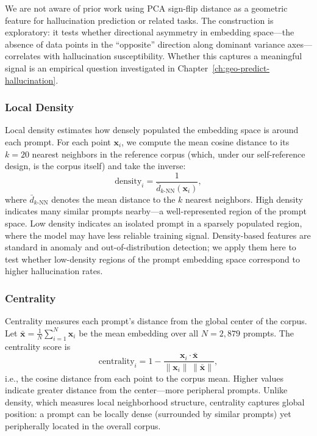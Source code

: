 We are not aware of prior work using PCA sign-flip distance as a geometric feature for hallucination prediction or related tasks. The construction is exploratory: it tests whether directional asymmetry in embedding space---the absence of data points in the ``opposite'' direction along dominant variance axes---correlates with hallucination susceptibility. Whether this captures a meaningful signal is an empirical question investigated in Chapter~\ref{ch:geo-predict-hallucination}.

\subsubsection{Local Density}
\label{sec:density}

Local density estimates how densely populated the embedding space is around each prompt. For each point $\mathbf{x}_i$, we compute the mean cosine distance to its $k = 20$ nearest neighbors in the reference corpus (which, under our self-reference design, is the corpus itself) and take the inverse:
\begin{equation}
\text{density}_i = \frac{1}{\bar{d}_{k\text{-NN}}(\mathbf{x}_i)},
\label{eq:density}
\end{equation}
where $\bar{d}_{k\text{-NN}}$ denotes the mean distance to the $k$ nearest neighbors. High density indicates many similar prompts nearby---a well-represented region of the prompt space. Low density indicates an isolated prompt in a sparsely populated region, where the model may have less reliable training signal. Density-based features are standard in anomaly and out-of-distribution detection; we apply them here to test whether low-density regions of the prompt embedding space correspond to higher hallucination rates.

\subsubsection{Centrality}
\label{sec:centrality}

Centrality measures each prompt's distance from the global center of the corpus. Let $\bar{\mathbf{x}} = \frac{1}{N}\sum_{i=1}^{N} \mathbf{x}_i$ be the mean embedding over all $N = 2{,}879$ prompts. The centrality score is
\begin{equation}
\text{centrality}_i = 1 - \frac{\mathbf{x}_i \cdot \bar{\mathbf{x}}}{\|\mathbf{x}_i\| \, \|\bar{\mathbf{x}}\|},
\label{eq:centrality}
\end{equation}
i.e., the cosine distance from each point to the corpus mean. Higher values indicate greater distance from the center---more peripheral prompts. Unlike density, which measures local neighborhood structure, centrality captures global position: a prompt can be locally dense (surrounded by similar prompts) yet peripherally located in the overall corpus.


